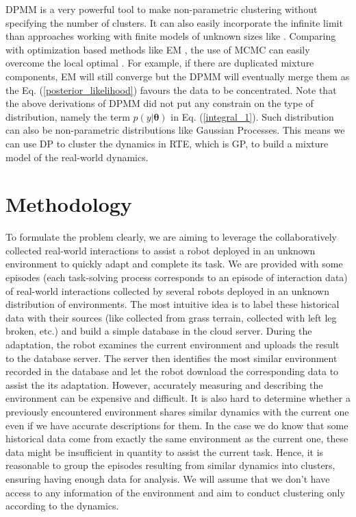 \documentclass[journal]{IEEEtran}
\begin{document}
DPMM is a very powerful tool to make non-parametric clustering without specifying the number of clusters. 
It can also easily incorporate the infinite limit than approaches working with finite models of unknown sizes like \cite{Bayesian_mixture}.
Comparing with optimization based methods like EM \cite{EM}, the use of MCMC can easily overcome the local optimal \cite{infinite_GMM}. 
For example, if there are duplicated mixture components, EM will still converge but the DPMM will eventually merge them as the Eq. (\ref{posterior_likelihood}) favours the data to be concentrated. 
Note that the above derivations of DPMM did not put any constrain on the type of distribution, namely the term $p(y|\bm{\theta})$ in Eq. (\ref{integral_1}). Such distribution can also be non-parametric distributions like Gaussian Processes. 
This means we can use DP to cluster the dynamics in RTE, which is GP, to build a mixture model of the real-world dynamics.



\section{Methodology}
To formulate the problem clearly, we are aiming to leverage the collaboratively collected real-world interactions to assist a robot deployed in an unknown environment to quickly adapt and complete its task.
We are provided with some episodes (each task-solving process corresponds to an episode of interaction data) of real-world interactions collected by several robots deployed in an unknown distribution of environments.
The most intuitive idea is to label these historical data with their sources (like collected from grass terrain, collected with left leg broken, etc.) and build a simple database in the cloud server. 
During the adaptation, the robot examines the current environment and uploads the result to the database server. The server then identifies the most similar environment recorded in the database and let the robot download the corresponding data to assist the its adaptation.
However, accurately measuring and describing the environment can be expensive and difficult. It is also hard to determine whether a previously encountered environment shares similar dynamics with the current one even if we have accurate descriptions for them.
In the case we do know that some historical data come from exactly the same environment as the current one, these data might be insufficient in quantity to assist the current task.
Hence, it is reasonable to group the episodes resulting from similar dynamics into clusters, ensuring having enough data for analysis.
We will assume that we don’t have access to any information of the environment and aim to conduct clustering only according to the dynamics. 
\end{document}
